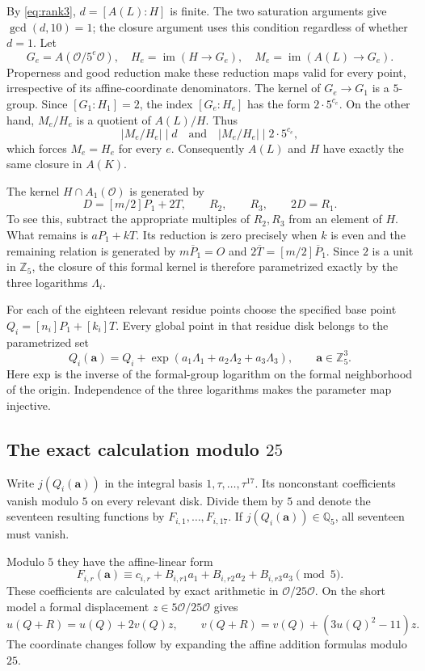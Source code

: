 \documentclass[11pt,a4paper]{article}
\theoremstyle{definition}\newtheorem{definition}[theorem]{Definition}
\theoremstyle{remark}\newtheorem{remark}[theorem]{Remark}
\newcommand{\Q}{\mathbb Q}\newcommand{\Z}{\mathbb Z}\newcommand{\F}{\mathbb F}
\newcommand{\OO}{\mathcal O}\newcommand{\Cl}{\operatorname{Cl}}
\begin{document}
By \eqref{eq:rank3}, $d=[A(L):H]$ is finite. The two saturation arguments give $\gcd(d,10)=1$; the closure argument uses this condition regardless of whether $d=1$. Let
\[
G_e=A(\OO/5^e\OO),\quad H_e=\operatorname{im}(H\to G_e),
\quad M_e=\operatorname{im}(A(L)\to G_e).
\]
Properness and good reduction make these reduction maps valid for every
point, irrespective of its affine-coordinate denominators. The kernel of
$G_e\to G_1$ is a $5$-group. Since $[G_1:H_1]=2$, the index
$[G_e:H_e]$ has the form $2\cdot5^{c_e}$. On the other hand,
$M_e/H_e$ is a quotient of $A(L)/H$. Thus
\[
|M_e/H_e|\mid d\quad\text{and}\quad |M_e/H_e|\mid2\cdot5^{c_e},
\]
which forces $M_e=H_e$ for every $e$. Consequently $A(L)$ and $H$
have exactly the same closure in $A(K)$.

The kernel $H\cap A_1(\OO)$ is generated by
\[
D=[m/2]P_1+2T,\qquad R_2,\qquad R_3,
\qquad 2D=R_1.
\]
To see this, subtract the appropriate multiples of $R_2,R_3$ from an
element of $H$. What remains is $aP_1+kT$. Its reduction is zero
precisely when $k$ is even and the remaining relation is generated by
$m\overline P_1=O$ and $2\overline T=[m/2]\overline P_1$.
Since $2$ is a unit in $\Z_5$, the closure of this formal kernel is
therefore parametrized exactly by the three logarithms $\Lambda_i$.

For each of the eighteen relevant residue points choose the specified
base point $Q_i=[n_i]P_1+[k_i]T$. Every global point in that residue
disk belongs to the parametrized set
\begin{equation}\label{eq:param}
Q_i(\mathbf a)=Q_i+\exp(a_1\Lambda_1+a_2\Lambda_2+a_3\Lambda_3),
\qquad\mathbf a\in\Z_5^3.
\end{equation}
Here exp is the inverse of the formal-group logarithm on the formal neighborhood of the origin. Independence of the three logarithms makes the parameter map injective.

\subsection{The exact calculation modulo $25$}

Write $j(Q_i(\mathbf a))$ in the integral basis
$1,\tau,\ldots,\tau^{17}$. Its nonconstant coefficients vanish
modulo $5$ on every relevant disk. Divide them by $5$ and denote the
seventeen resulting functions by $F_{i,1},\ldots,F_{i,17}$.
If $j(Q_i(\mathbf a))\in\Q_5$, all seventeen must vanish.

Modulo $5$ they have the affine-linear form
\begin{equation}\label{eq:mod25system}
F_{i,r}(\mathbf a)\equiv c_{i,r}
 +B_{i,r1}a_1+B_{i,r2}a_2+B_{i,r3}a_3\pmod5.
\end{equation}
These coefficients are calculated by exact arithmetic in $\OO/25\OO$.
On the short model a formal displacement $z\in5\OO/25\OO$ gives
\[
u(Q+R)=u(Q)+2v(Q)z,\qquad
v(Q+R)=v(Q)+(3u(Q)^2-11)z.
\]
The coordinate changes follow by expanding the affine addition formulas modulo $25$.
\end{document}
